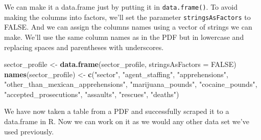 \documentclass[
  12pt,
]{book}
\newenvironment{Shaded}{\begin{snugshade}}{\end{snugshade}}
\newcommand{\DataTypeTok}[1]{\textcolor[rgb]{0.13,0.29,0.53}{#1}}
\newcommand{\KeywordTok}[1]{\textcolor[rgb]{0.13,0.29,0.53}{\textbf{#1}}}
\newcommand{\NormalTok}[1]{#1}
\newcommand{\OtherTok}[1]{\textcolor[rgb]{0.56,0.35,0.01}{#1}}
\newcommand{\StringTok}[1]{\textcolor[rgb]{0.31,0.60,0.02}{#1}}
\begin{document}
We can make it a data.frame just by putting it in \texttt{data.frame()}. To avoid making the columns into factors, we'll set the parameter \texttt{stringsAsFactors} to FALSE. And we can assign the columns names using a vector of strings we can make. We'll use the same column names as in the PDF but in lowercase and replacing spaces and parentheses with underscores.

\begin{Shaded}
\begin{Highlighting}[]
\NormalTok{sector\_profile <{-}}\StringTok{ }\KeywordTok{data.frame}\NormalTok{(sector\_profile, }\DataTypeTok{stringsAsFactors =} \OtherTok{FALSE}\NormalTok{)}
\KeywordTok{names}\NormalTok{(sector\_profile) <{-}}\StringTok{ }\KeywordTok{c}\NormalTok{(}\StringTok{"sector"}\NormalTok{,}
                           \StringTok{"agent\_staffing"}\NormalTok{,}
                           \StringTok{"apprehensions"}\NormalTok{,}
                           \StringTok{"other\_than\_mexican\_apprehensions"}\NormalTok{, }
                           \StringTok{"marijuana\_pounds"}\NormalTok{,}
                           \StringTok{"cocaine\_pounds"}\NormalTok{,}
                           \StringTok{"accepted\_prosecutions"}\NormalTok{,}
                           \StringTok{"assaults"}\NormalTok{,}
                           \StringTok{"rescues"}\NormalTok{,}
                           \StringTok{"deaths"}\NormalTok{)}
\end{Highlighting}
\end{Shaded}

We have now taken a table from a PDF and successfully scraped it to a data.frame in R. Now we can work on it as we would any other data set we've used previously.
\end{document}

